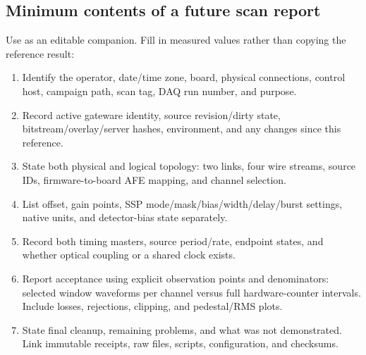 \documentclass[10pt,a4paper]{article}
\newcommand{\code}[1]{\texttt{\detokenize{#1}}}
\begin{document}
\subsection{Minimum contents of a future scan report}
Use \code{report-template.tex} as an editable companion. Fill in measured values rather than copying the reference result:
\begin{enumerate}
\item Identify the operator, date/time zone, board, physical connections, control host, campaign path, scan tag, DAQ run number, and purpose.
\item Record active gateware identity, source revision/dirty state, bitstream/overlay/server hashes, environment, and any changes since this reference.
\item State both physical and logical topology: two links, four wire streams, source IDs, firmware-to-board AFE mapping, and channel selection.
\item List offset, gain points, SSP mode/mask/bias/width/delay/burst settings, native units, and detector-bias state separately.
\item Record both timing masters, source period/rate, endpoint states, and whether optical coupling or a shared clock exists.
\item Report acceptance using explicit observation points and denominators: selected window waveforms per channel versus full hardware-counter intervals. Include losses, rejections, clipping, and pedestal/RMS plots.
\item State final cleanup, remaining problems, and what was not demonstrated. Link immutable receipts, raw files, scripts, configuration, and checksums.
\end{enumerate}
\end{document}
